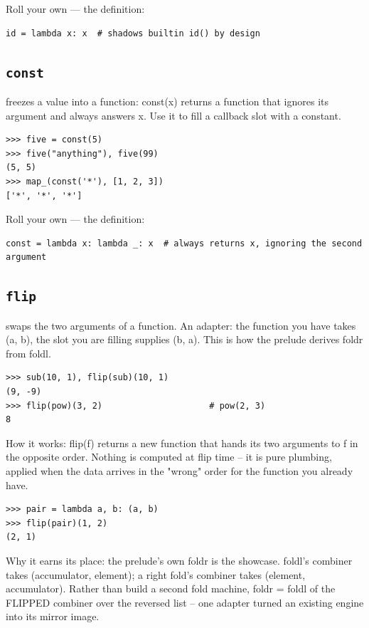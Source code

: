 \documentclass[10pt,letterpaper]{book}
\begin{document}
Roll your own --- the definition:

\begin{lstlisting}[style=ex]
id = lambda x: x  # shadows builtin id() by design
\end{lstlisting}
\subsection{\texttt{const}}\label{def:const}
freezes a value into a function: const(x) returns a function that ignores its argument and always answers x. Use it to fill a callback slot with a constant.
\begin{lstlisting}[style=ex]
>>> five = const(5)
>>> five("anything"), five(99)
(5, 5)
>>> map_(const('*'), [1, 2, 3])
['*', '*', '*']
\end{lstlisting}

Roll your own --- the definition:

\begin{lstlisting}[style=ex]
const = lambda x: lambda _: x  # always returns x, ignoring the second argument
\end{lstlisting}
\subsection{\texttt{flip}}\label{def:flip}
swaps the two arguments of a function. An adapter: the function you have takes (a, b), the slot you are filling supplies (b, a). This is how the prelude derives foldr from foldl.
\begin{lstlisting}[style=ex]
>>> sub(10, 1), flip(sub)(10, 1)
(9, -9)
>>> flip(pow)(3, 2)                     # pow(2, 3)
8
\end{lstlisting}

How it works: flip(f) returns a new function that hands its two arguments to f in the opposite order. Nothing is computed at flip time -- it is pure plumbing, applied when the data arrives in the "wrong" order for the function you already have.

\begin{lstlisting}[style=ex]
>>> pair = lambda a, b: (a, b)
>>> flip(pair)(1, 2)
(2, 1)
\end{lstlisting}

Why it earns its place: the prelude's own foldr is the showcase. foldl's combiner takes (accumulator, element); a right fold's combiner takes (element, accumulator). Rather than build a second fold machine, foldr = foldl of the FLIPPED combiner over the reversed list -- one adapter turned an existing engine into its mirror image.
\end{document}
